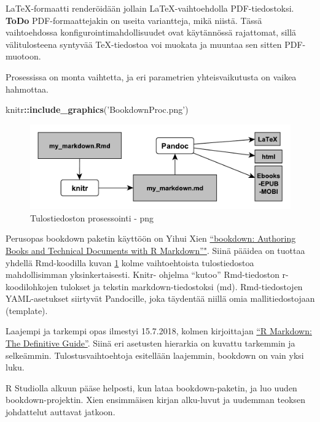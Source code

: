 \documentclass[finnish,]{book}
\newenvironment{Shaded}{\begin{snugshade}}{\end{snugshade}}
\newcommand{\KeywordTok}[1]{\textcolor[rgb]{0.13,0.29,0.53}{\textbf{#1}}}
\newcommand{\NormalTok}[1]{#1}
\newcommand{\OperatorTok}[1]{\textcolor[rgb]{0.81,0.36,0.00}{\textbf{#1}}}
\newcommand{\StringTok}[1]{\textcolor[rgb]{0.31,0.60,0.02}{#1}}
\begin{document}
LaTeX-formaatti renderöidään jollain LaTeX-vaihtoehdolla PDF-tiedostoksi. \textbf{ToDo} PDF-formaattejakin on useita variantteja, mikä niistä. Tässä vaihtoehdossa konfigurointimahdollisuudet ovat käytännössä rajattomat, sillä välitulosteena syntyvää TeX-tiedostoa voi muokata ja muuntaa sen sitten PDF-muotoon.

Prosessissa on monta vaihtetta, ja eri parametrien yhteisvaikutusta on vaikea hahmottaa.

\begin{Shaded}
\begin{Highlighting}[]
\NormalTok{knitr}\OperatorTok{::}\KeywordTok{include_graphics}\NormalTok{(}\StringTok{'BookdownProc.png'}\NormalTok{)}
\end{Highlighting}
\end{Shaded}

\begin{figure}

{\centering \includegraphics[width=0.5\linewidth]{BookdownProc} 

}

\caption{Tulostiedoston prosessointi - png}\label{fig:bdprocess1}
\end{figure}

Perusopas bookdown paketin käyttöön on Yihui Xien \href{https://bookdown.org/yihui/bookdown/}{``bookdown: Authoring Books and Technical Documents with R Markdown''"}. Siinä pääidea on tuottaa yhdellä Rmd-koodilla kuvan
\ref{fig:bdprocess1} kolme vaihtoehtoista tulostiedostoa mahdollisimman yksinkertaisesti. Knitr- ohjelma ``kutoo'' Rmd-tiedoston r-koodilohkojen tulokset ja tekstin markdown-tiedostoksi (md). Rmd-tiedostojen YAML-asetukset siirtyvät Pandocille, joka täydentää niillä omia mallitiedostojaan (template).

Laajempi ja tarkempi opas ilmestyi 15.7.2018, kolmen kirjoittajan \href{https://bookdown.org/yihui/rmarkdown/}{``R Markdown: The Definitive Guide''}. Siinä eri asetusten hierarkia on kuvattu tarkemmin ja selkeämmin. Tulostusvaihtoehtoja esitellään laajemmin, bookdown on vain yksi luku.

R Studiolla alkuun pääse helposti, kun lataa bookdown-paketin, ja luo uuden bookdown-projektin. Xien ensimmäisen kirjan alku-luvut ja uudemman teoksen johdattelut auttavat jatkoon.
\end{document}
